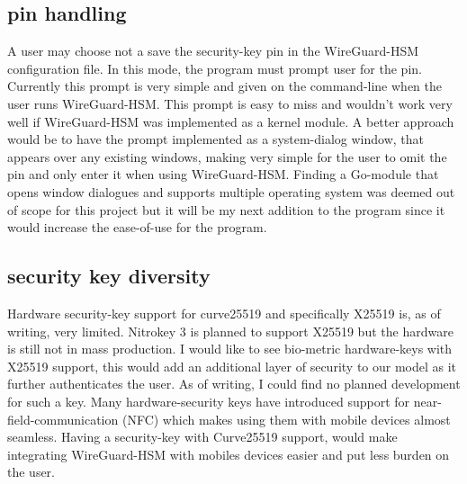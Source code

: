 \documentclass [11pt, proquest] {uwthesis}[2020/02/24]
\begin{document}
\subsection{pin handling}
 A user may choose not a save the security-key pin in the WireGuard-HSM configuration file. In this mode, the program must prompt user for the pin. Currently this prompt is very simple and given on the command-line when the user runs WireGuard-HSM. This prompt is easy to miss and wouldn't work very well if WireGuard-HSM was implemented as a kernel module. A better approach would be to have the prompt implemented as a system-dialog window, that appears over any existing windows, making very simple for the user to omit the pin and only enter it when using WireGuard-HSM. Finding a Go-module that opens window dialogues and supports multiple operating system was deemed out of scope for this project but it will be my next addition to the program since it would increase the ease-of-use for the program. 
 
\subsection{security key diversity}
Hardware security-key support for curve25519 and specifically X25519 is, as of writing, very limited. Nitrokey 3 is planned to support X25519 but the hardware is still not in mass production. I would like to see bio-metric hardware-keys with X25519 support, this would add an additional layer of security to our model as it further authenticates the user. As of writing, I could find no planned development for such a key. Many hardware-security keys have introduced support for near-field-communication (NFC) which makes using them with mobile devices almost seamless. Having a security-key with Curve25519 support, would make integrating WireGuard-HSM with mobiles devices easier and put less burden on the user. 
\end{document}
